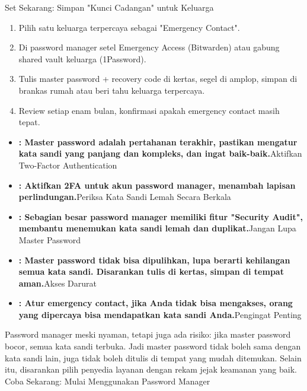 \begin{tcbpractice}{Set Sekarang: Simpan "Kunci Cadangan" untuk Keluarga}
\begin{enumerate}
  \item Pilih satu keluarga terpercaya sebagai "Emergency Contact".
  \item Di password manager setel Emergency Access (Bitwarden) atau gabung shared vault keluarga (1Password).
  \item Tulis master password + recovery code di kertas, segel di amplop, simpan di brankas rumah atau beri tahu keluarga terpercaya.
  \item Review setiap enam bulan, konfirmasi apakah emergency contact masih tepat.
\end{enumerate}

\end{tcbpractice}


\begin{itemize}
  \item \textbf{: Master password adalah pertahanan terakhir, pastikan mengatur kata sandi yang panjang dan kompleks, dan ingat baik-baik.}Aktifkan Two-Factor Authentication
  \item \textbf{: Aktifkan 2FA untuk akun password manager, menambah lapisan perlindungan.}Periksa Kata Sandi Lemah Secara Berkala
  \item \textbf{: Sebagian besar password manager memiliki fitur "Security Audit", membantu menemukan kata sandi lemah dan duplikat.}Jangan Lupa Master Password
  \item \textbf{: Master password tidak bisa dipulihkan, lupa berarti kehilangan semua kata sandi. Disarankan tulis di kertas, simpan di tempat aman.}Akses Darurat
  \item \textbf{: Atur emergency contact, jika Anda tidak bisa mengakses, orang yang dipercaya bisa mendapatkan kata sandi Anda.}Pengingat Penting
\end{itemize}

\begin{tcbwarn}{Password manager meski nyaman, tetapi juga ada risiko: jika master password bocor, semua kata sandi terbuka. Jadi master password tidak boleh sama dengan kata sandi lain, juga tidak boleh ditulis di tempat yang mudah ditemukan. Selain itu, disarankan pilih penyedia layanan dengan rekam jejak keamanan yang baik.}
Coba Sekarang: Mulai Menggunakan Password Manager

\end{tcbwarn}

